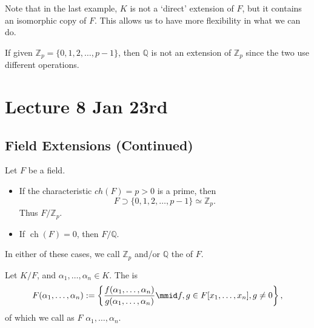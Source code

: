 \documentclass[notoc,notitlepage]{tufte-book}
\DeclareMathOperator{\ch}{ch}
\begin{document}
\begin{note}
  Note that in the last example, $K$ is not a `direct' extension of $F$, but it contains an isomorphic
  copy of $F$. This allows us to have more flexibility in what we can do.
\end{note}

\begin{warning}
  If given $\mathbb{Z}_p = \{ 0, 1, 2, \ldots, p - 1 \}$, then $\mathbb{Q}$ is not an extension of
  $\mathbb{Z}_p$ since the two use different operations.
\end{warning}



\chapter{Lecture 8 Jan 23rd}%
\label{chp:lecture_8_jan_23rd}

\section{Field Extensions (Continued)}%
\label{sec:field_extensions_continued}

\begin{eg}
  Let $F$ be a field.
  \begin{itemize}
    \item If the characteristic $ch(F) = p > 0$ is a prime, then 
      \begin{equation*}
        F \supset \{ 0, 1, 2, \ldots, p - 1 \} \simeq \mathbb{Z}_p.
      \end{equation*}
      Thus $F / \mathbb{Z}_p$.
    \item If $\ch(F) = 0$, then $F / \mathbb{Q}$.
  \end{itemize}
  In either of these cases, we call $\mathbb{Z}_p$ and/or $\mathbb{Q}$ the  of
  $F$.
\end{eg}

\begin{defn}\label{defn:generated_field_extension}
  Let $K / F$, and $\alpha_1, \ldots, \alpha_n \in K$. The  is
  \begin{equation*}
    F(\alpha_1, \ldots, \alpha_n) 
    := \left\{ \frac{f(\alpha_1, \ldots, \alpha_n)}{g(\alpha_1, \ldots, \alpha_n)} \mmid f, g \in F[x_1, \ldots, x_n], g \neq 0 \right\},
  \end{equation*}
  of which we call as $F$  $\alpha_1, \ldots, \alpha_n$.
\end{defn}
\end{document}
